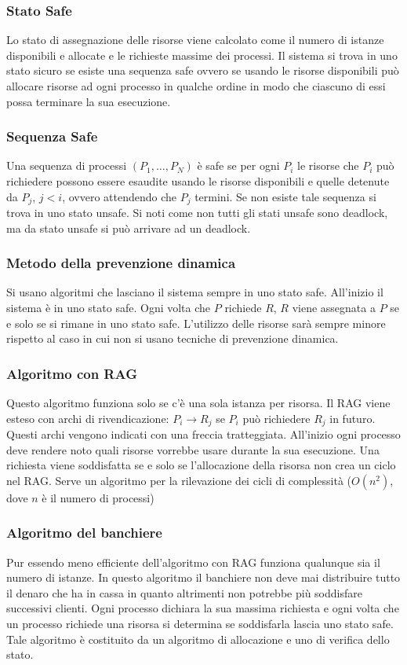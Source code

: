 \subsubsection{Stato Safe}
Lo stato di assegnazione delle risorse viene calcolato come il numero di istanze disponibili e allocate e le richieste massime dei processi. Il sistema si trova in uno stato sicuro
se esiste una sequenza safe ovvero se usando le risorse disponibili pu\`o allocare risorse ad ogni processo in qualche ordine in modo che ciascuno di essi possa terminare la sua
esecuzione. 
\subsubsection{Sequenza Safe}
Una sequenza di processi $(P_1, \dots, P_N)$ \`e safe se per ogni $P_i$ le risorse che $P_i$ pu\`o richiedere possono essere esaudite usando le risorse disponibili e quelle detenute da
$P_j$, $j < i$, ovvero attendendo che $P_j$ termini. Se non esiste tale sequenza si trova in uno stato unsafe. Si noti come non tutti gli stati unsafe sono deadlock, ma da stato 
unsafe si pu\`o arrivare ad un deadlock. 
\subsubsection{Metodo della prevenzione dinamica}
Si usano algoritmi che lasciano il sistema sempre in uno stato safe. All'inizio il sistema \`e in uno stato safe. Ogni volta che $P$ richiede $R$, $R$ viene assegnata a $P$ se e solo
se si rimane in uno stato safe. L'utilizzo delle risorse sar\`a sempre minore rispetto al caso in cui non si usano tecniche di prevenzione dinamica. 
\subsubsection{Algoritmo con RAG}
Questo algoritmo funziona solo se c'\`e una sola istanza per risorsa. Il RAG viene esteso con archi di rivendicazione: $P_i\rightarrow R_j$ se $P_i$ pu\`o richiedere $R_j$ in futuro. 
Questi archi vengono indicati con una freccia tratteggiata. All'inizio ogni processo deve rendere noto quali risorse vorrebbe usare durante la sua esecuzione. Una richiesta viene 
soddisfatta se e solo se l'allocazione della risorsa non crea un ciclo nel RAG. Serve un algoritmo per la rilevazione dei cicli di complessit\`a ($O(n^2)$, dove $n$ \`e il numero di 
processi)
\subsubsection{Algoritmo del banchiere}
Pur essendo meno efficiente dell'algoritmo con RAG funziona qualunque sia il numero di istanze. In questo algoritmo il banchiere non deve mai distribuire tutto il denaro che ha in cassa
in quanto altrimenti non potrebbe pi\`u soddisfare successivi clienti. Ogni processo dichiara la sua massima richiesta e ogni volta che un processo richiede una risorsa si determina se 
soddisfarla lascia uno stato safe. Tale algoritmo \`e costituito da un algoritmo di allocazione e uno di verifica dello stato. 

